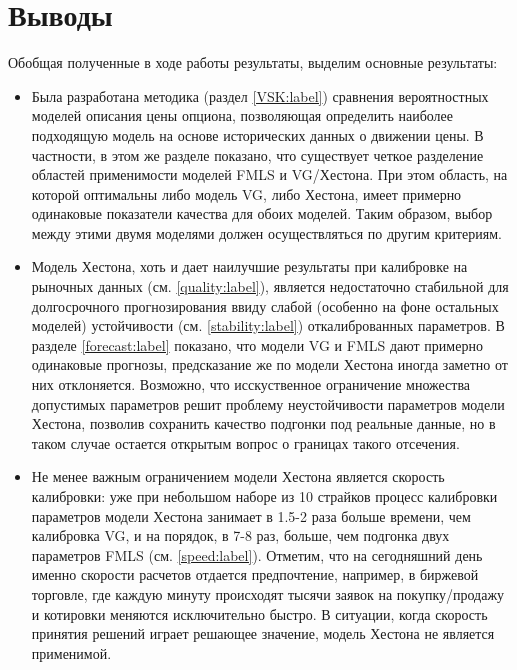 \documentclass[oneside, final, 12pt, a4paper]{article}
\begin{document}
\section{Выводы}
Обобщая полученные в ходе работы результаты, выделим основные результаты:
\begin{itemize}
\item Была разработана методика (раздел \ref{VSK:label}) сравнения вероятностных моделей описания цены опциона, позволяющая определить наиболее подходящую модель на основе исторических данных о движении цены. В частности, в этом же разделе показано, что существует четкое разделение областей применимости моделей FMLS и VG/Хестона. При этом область, на которой оптимальны либо модель VG, либо Хестона, имеет примерно одинаковые показатели качества для обоих моделей. Таким образом, выбор между этими двумя моделями должен осуществляться по другим критериям.
\item Модель Хестона, хоть и дает наилучшие результаты при калибровке на рыночных данных (см. \ref{quality:label}), является недостаточно стабильной для долгосрочного прогнозирования ввиду слабой (особенно на фоне остальных моделей) устойчивости (см. \ref{stability:label}) откалиброванных параметров. В разделе \ref{forecast:label} показано, что модели VG и FMLS дают примерно одинаковые прогнозы, предсказание же по модели Хестона иногда заметно от них отклоняется. Возможно, что исскуственное ограничение множества допустимых параметров решит проблему неустойчивости параметров модели Хестона, позволив сохранить качество подгонки под реальные данные, но в таком случае остается открытым вопрос о границах такого отсечения.
\item Не менее важным ограничением модели Хестона является скорость калибровки: уже при небольшом наборе из 10 страйков процесс калибровки параметров модели Хестона занимает в 1.5-2 раза больше времени, чем калибровка VG, и на порядок, в 7-8 раз, больше, чем подгонка двух параметров FMLS (см. \ref{speed:label}). Отметим, что на сегодняшний день именно скорости расчетов отдается предпочтение, например, в биржевой торговле, где каждую минуту происходят тысячи заявок на покупку/продажу и котировки меняются исключительно быстро. В ситуации, когда скорость принятия решений играет решающее значение, модель Хестона не является применимой.
\end{itemize}


\newpage
\end{document}
